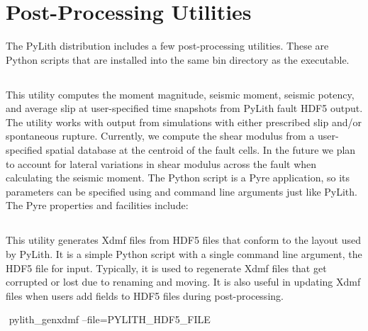 \section{Post-Processing Utilities}

The PyLith distribution includes a few post-processing utilities.
These are Python scripts that are installed into the same bin directory
as the  executable.


\subsection{}

This utility computes the moment magnitude, seismic moment, seismic
potency, and average slip at user-specified time snapshots from PyLith
fault HDF5 output. The utility works with output from simulations
with either prescribed slip and/or spontaneous rupture. Currently,
we compute the shear modulus from a user-specified spatial database
at the centroid of the fault cells. In the future we plan to account
for lateral variations in shear modulus across the fault when calculating
the seismic moment. The Python script is a Pyre application, so its
parameters can be specified using  and command line arguments
just like PyLith. The Pyre properties and facilities include:
\begin{inventory}
\end{inventory}

\subsection{}
\label{sub:genxdmf}

This utility generates Xdmf files from HDF5 files that conform to
the layout used by PyLith. It is a simple Python script with a single
command line argument, the HDF5 file for input. Typically, it is used
to regenerate Xdmf files that get corrupted or lost due to renaming
and moving. It is also useful in updating Xdmf files when users add
fields to HDF5 files during post-processing.
\begin{shell}
$$ pylith_genxdmf --file=PYLITH_HDF5_FILE
\end{shell}

